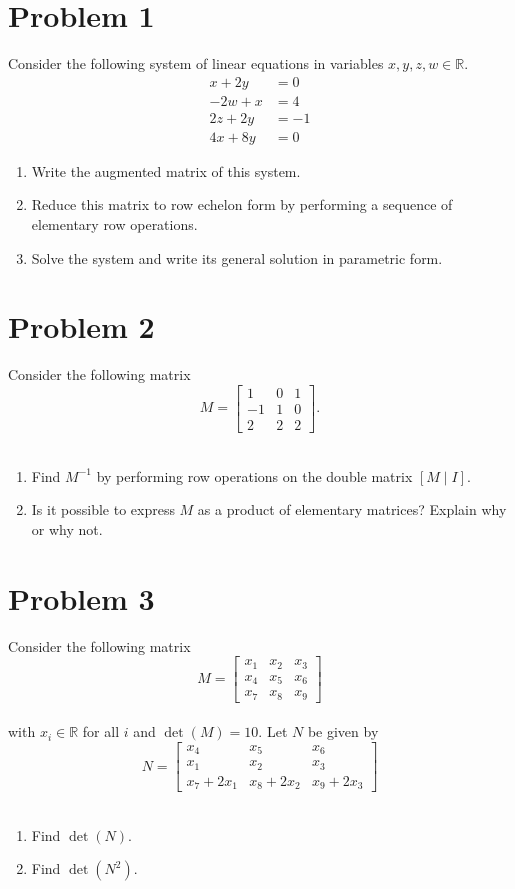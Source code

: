 \documentclass[a4paper,12pt,fleqn]{article}
\def\R{\mathbb R}
\begin{document}
\section*{Problem 1}
Consider the following system of linear equations in variables $x,y,z,w\in \R$.
\begin{align*}
x+2y&=0 \\
-2w+x&=4 \\
2z+2y&=-1 \\
4x+8y&=0
\end{align*}
\noindent
\begin{enumerate}
\item Write the augmented matrix of this system.
\item Reduce this matrix to row echelon form by performing a sequence of elementary row
operations.
\item Solve the system and write its general solution in parametric form.
\end{enumerate}


\section*{Problem 2}
Consider the following matrix
$$
M=\left[ \begin{array}{ccc} 1 & 0 & 1 \\ -1 & 1 & 0 \\ 2 & 2 & 2 \end{array} \right].
$$ \\
\noindent
\begin{enumerate}
\item Find $M^{-1}$ by performing row operations on the double
matrix $[M\; | \;I]$.
\item Is it possible to express $M$ as a product of elementary matrices? Explain why or why not.
\end{enumerate}

\newpage

\section*{Problem 3}
Consider the following matrix
$$
M=\left[ \begin{array}{ccc} x_1 & x_2 & x_3 \\ x_4 & x_5 & x_6 \\ x_7 & x_8 & x_9  \end{array} \right]
$$ \\
with $x_i \in \R$ for all $i$ and $\det(M)=10$.
Let $N$ be given by
$$
N=\left[ \begin{array}{ccc} x_4 & x_5 & x_6 \\ x_1 & x_2 & x_3 \\ x_7+2x_1 & x_8+2x_2 & x_9+2x_3  \end{array} \right]
$$ \\
\begin{enumerate}
\item Find $\det(N)$.
\item Find $\det(N^2)$.
\end{enumerate}
\end{document}

